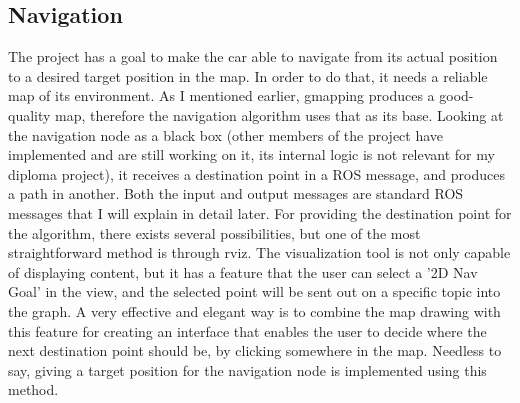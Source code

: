 \subsection{Navigation}
The project has a goal to make the car able to navigate from its actual position to a desired target position in the map. In order to do that, it needs a reliable map of its environment. As I mentioned earlier, gmapping produces a good-quality map, therefore the navigation algorithm uses that as its base. Looking at the navigation node as a black box (other members of the project have implemented and are still working on it, its internal logic is not relevant for my diploma project), it receives a destination point in a ROS message, and produces a path in another. Both the input and output messages are standard ROS messages that I will explain in detail later. For providing the destination point for the algorithm, there exists several possibilities, but one of the most straightforward method is through rviz. The visualization tool is not only capable of displaying content, but it has a feature that the user can select a '2D Nav Goal' in the view, and the selected point will be sent out on a specific topic into the graph. A very effective and elegant way is to combine the map drawing with this feature for creating an interface that enables the user to decide where the next destination point should be, by clicking somewhere in the map. Needless to say, giving a target position for the navigation node is implemented using this method.


